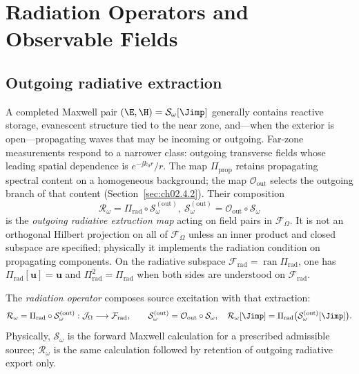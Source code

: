 
\section{Radiation Operators and Observable Fields}
\label{sec:ch02.6}

\subsection{Outgoing radiative extraction}
\label{sec:ch02.6.1}

A completed Maxwell pair $(\E,\H)=\mathcal{S}_\omega[\Jimp]$ generally contains reactive storage, evanescent structure tied to the near zone, and---when the exterior is open---propagating waves that may be incoming or outgoing. Far-zone measurements respond to a narrower class: outgoing transverse fields whose leading spatial dependence is $e^{-\jj k_0 r}/r$. The map $\Pi_{\mathrm{prop}}$ retains propagating spectral content on a homogeneous background; the map $\mathcal{O}_{\mathrm{out}}$ selects the outgoing branch of that content (Section~\ref{sec:ch02.4.2}). Their composition
\begin{equation}
\label{eq:ch2.Pirad-composition-repeat}
\mathcal{R}_\omega=\Pi_{\mathrm{rad}}\circ\mathcal{S}_\omega^{\mathrm{(out)}},\ 
\mathcal{S}_\omega^{\mathrm{(out)}}=\mathcal{O}_{\mathrm{out}}\circ\mathcal{S}_\omega
\end{equation}
is the \emph{outgoing radiative extraction map} acting on field pairs in $\mathcal{F}_\Omega$. It is not an orthogonal Hilbert projection on all of $\mathcal{F}_\Omega$ unless an inner product and closed subspace are specified; physically it implements the radiation condition on propagating components. On the radiative subspace $\mathcal{F}_{\mathrm{rad}}=\operatorname{ran}\Pi_{\mathrm{rad}}$, one has $\Pi_{\mathrm{rad}}[\mathbf{u}]=\mathbf{u}$ and $\Pi_{\mathrm{rad}}^2=\Pi_{\mathrm{rad}}$ when both sides are understood on $\mathcal{F}_{\mathrm{rad}}$.

The \emph{radiation operator} composes source excitation with that extraction:
\begin{equation}
\label{eq:ch2.Romega-composition-repeat}
\mathcal{R}_\omega=\Pi_{\mathrm{rad}}\circ\mathcal{S}_\omega^{\mathrm{(out)}}:\mathcal{J}_\Omega\longrightarrow\mathcal{F}_{\mathrm{rad}},
\qquad
\mathcal{S}_\omega^{\mathrm{(out)}}=\mathcal{O}_{\mathrm{out}}\circ\mathcal{S}_\omega,\quad
\mathcal{R}_\omega[\Jimp]=\Pi_{\mathrm{rad}}\big(\mathcal{S}_\omega^{\mathrm{(out)}}[\Jimp]\big).
\end{equation}
Physically, $\mathcal{S}_\omega$ is the forward Maxwell calculation for a prescribed admissible source; $\mathcal{R}_\omega$ is the same calculation followed by retention of outgoing radiative export only.


